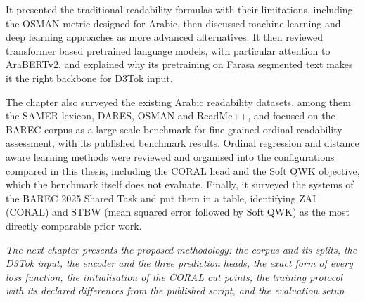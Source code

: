 \documentclass[12pt]{report}
\begin{document}
It presented the traditional readability formulas with their limitations, including the OSMAN metric designed for Arabic, then discussed machine learning and deep learning approaches as more advanced alternatives. It then reviewed transformer based pretrained language models, with particular attention to AraBERTv2, and explained why its pretraining on Farasa segmented text makes it the right backbone for D3Tok input.

The chapter also surveyed the existing Arabic readability datasets, among them the SAMER lexicon, DARES, OSMAN and ReadMe++, and focused on the BAREC corpus as a large scale benchmark for fine grained ordinal readability assessment, with its published benchmark results. Ordinal regression and distance aware learning methods were reviewed and organised into the configurations compared in this thesis, including the CORAL head and the Soft QWK objective, which the benchmark itself does not evaluate. Finally, it surveyed the systems of the BAREC 2025 Shared Task and put them in a table, identifying ZAI (CORAL) and STBW (mean squared error followed by Soft QWK) as the most directly comparable prior work.

\textit{The next chapter presents the proposed methodology: the corpus and its splits, the D3Tok input, the encoder and the three prediction heads, the exact form of every loss function, the initialisation of the CORAL cut points, the training protocol with its declared differences from the published script, and the evaluation setup}













\end{document}

